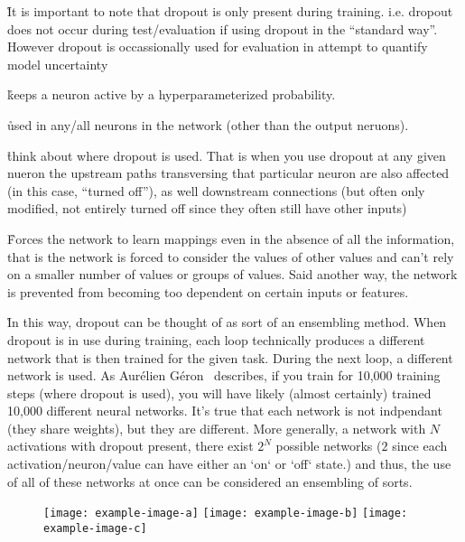 \r{It is important to note that dropout is only present during training. i.e. dropout does not occur during test/evaluation if using dropout in the ``standard way''. However dropout is occassionally used for evaluation in attempt to quantify model uncertainty }

\r{keeps a neuron active by a hyperparameterized probability.}

\r{used in any/all neurons in the network (other than the output neruons).}

\r{think about where dropout is used. That is when you use dropout at any given nueron the upstream paths transversing that particular neuron are also affected (in this case, ``turned off''), as well downstream connections (but often only modified, not entirely turned off since they often still have other inputs) }

\r{Forces the network to learn mappings even in the absence of all the information, that is the network is forced to consider the values of other values and can't rely on a smaller number of values or groups of values. Said another way, the network is prevented from becoming too dependent on certain inputs or features.}

\r{In this way, dropout can be thought of as sort of an ensembling method. When dropout is in use during training, each loop technically produces a different network that is then trained for the given task. During the next loop, a different network is used. As Aurélien Géron~\cite{geron2019hands} describes, if you train for 10,000 training steps (where dropout is used), you will have likely (almost certainly) trained 10,000 different neural networks. It's true that each network is not indpendant (they share weights), but they are different. More generally, a network with $N$ activations with dropout present, there exist $2^N$ possible networks ($2$ since each activation/neuron/value can have either an `on` or `off` state.) and thus, the use of all of these networks at once can be considered an ensembling of sorts.}




\begin{figure}[htp]
	\centering
	\texttt{[image: example-image-a]}\hfil
	\texttt{[image: example-image-b]}\hfil
	\texttt{[image: example-image-c]}\hfil
	\caption{}
	\label{fig:regularization_dropout_overview_training}
\end{figure}

